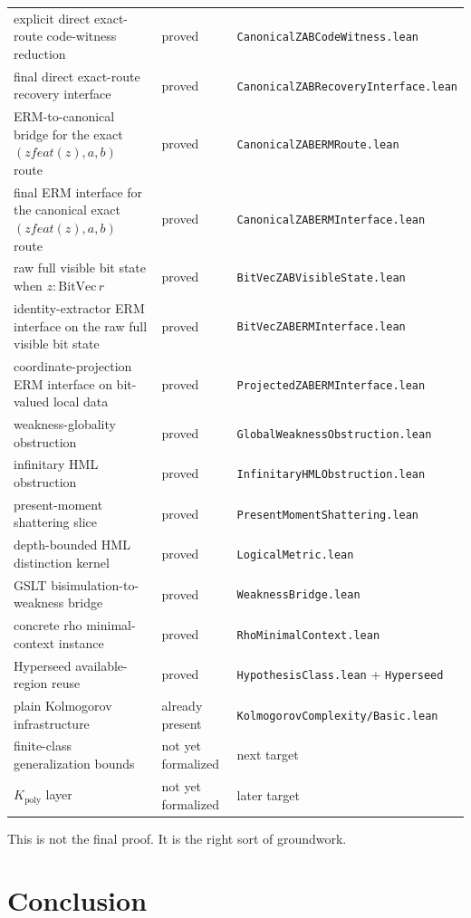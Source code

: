 \documentclass[11pt]{article}
\theoremstyle{remark}
\begin{document}
\begin{center}
\begin{tabular}{lll}
explicit direct exact-route code-witness reduction & proved & \texttt{CanonicalZABCodeWitness.lean} \\
final direct exact-route recovery interface & proved & \texttt{CanonicalZABRecoveryInterface.lean} \\
ERM-to-canonical bridge for the exact $(zfeat(z),a,b)$ route & proved & \texttt{CanonicalZABERMRoute.lean} \\
final ERM interface for the canonical exact $(zfeat(z),a,b)$ route & proved & \texttt{CanonicalZABERMInterface.lean} \\
raw full visible bit state when $z : \mathrm{BitVec}\, r$ & proved & \texttt{BitVecZABVisibleState.lean} \\
identity-extractor ERM interface on the raw full visible bit state & proved & \texttt{BitVecZABERMInterface.lean} \\
coordinate-projection ERM interface on bit-valued local data & proved & \texttt{ProjectedZABERMInterface.lean} \\
weakness-globality obstruction & proved & \texttt{GlobalWeaknessObstruction.lean} \\
infinitary HML obstruction & proved & \texttt{InfinitaryHMLObstruction.lean} \\
present-moment shattering slice & proved & \texttt{PresentMomentShattering.lean} \\
depth-bounded HML distinction kernel & proved & \texttt{LogicalMetric.lean} \\
GSLT bisimulation-to-weakness bridge & proved & \texttt{WeaknessBridge.lean} \\
concrete rho minimal-context instance & proved & \texttt{RhoMinimalContext.lean} \\
Hyperseed available-region reuse & proved & \texttt{HypothesisClass.lean} + \texttt{Hyperseed} \\
plain Kolmogorov infrastructure & already present & \texttt{KolmogorovComplexity/Basic.lean} \\
finite-class generalization bounds & not yet formalized & next target \\
\(K_{\mathrm{poly}}\) layer & not yet formalized & later target \\
\bottomrule
\end{tabular}
\end{center}

This is not the final proof.  It is the right sort of groundwork.

\section{Conclusion}
\end{document}
